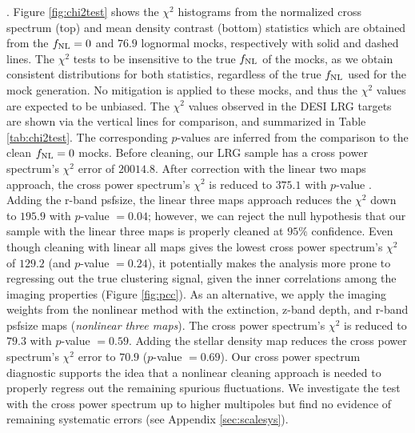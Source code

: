 . Figure \ref{fig:chi2test} shows the $\chi^{2}$ histograms from the normalized cross spectrum (top) and mean density contrast (bottom) statistics which are obtained from the $f_{\rm NL}=0$ and $76.9$ lognormal mocks, respectively with solid and dashed lines. The $\chi^{2}$ tests  to be insensitive to the true $f_{\rm NL}$ of the mocks, as we obtain consistent distributions for both statistics, regardless of the true $f_{\rm NL}$ used for the mock generation.  No mitigation is applied to these mocks, and thus the $\chi^{2}$ values are expected to be unbiased. The $\chi^{2}$ values observed in the DESI LRG targets are shown via the vertical lines for comparison, and summarized in Table \ref{tab:chi2test}. The corresponding $p$-values are inferred from the comparison to the clean $f_{\rm NL}=0$ mocks. Before cleaning, our LRG sample has a cross power spectrum's $\chi^{2}$ error of $20014.8$. After correction with the linear two maps approach, the cross power spectrum's $\chi^{2}$ is reduced to $375.1$ with $p$-value . Adding the r-band psfsize, the linear three maps approach reduces the $\chi^{2}$ down to $195.9$ with $p$-value $=0.04$; however, we can reject the null hypothesis that our sample with the linear three maps is properly cleaned at $95\%$ confidence. Even though cleaning with linear all maps gives the lowest cross power spectrum's $\chi^{2}$ of $129.2$ (and $p$-value $=0.24$), it potentially makes the analysis more prone to regressing out the true clustering signal, given the inner correlations among the imaging properties (Figure \ref{fig:pcc}). As an alternative, we apply the imaging weights from the nonlinear method with the extinction, z-band depth, and r-band psfsize maps (\textit{nonlinear three maps}). The cross power spectrum's $\chi^{2}$ is reduced to $79.3$ with $p$-value $=0.59$. Adding the stellar density map reduces the cross power spectrum's $\chi^{2}$ error to $70.9$ ($p$-value $=0.69$). Our cross power spectrum diagnostic supports the idea that a nonlinear cleaning approach is needed to properly regress out the remaining spurious fluctuations. We investigate the test with the cross power spectrum up to higher multipoles but find no evidence of remaining systematic errors (see Appendix \ref{sec:scalesys}). 




